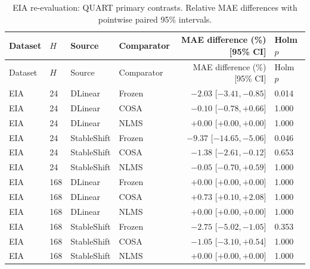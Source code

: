 \begin{longtable}{lllp{}rp{}}
\caption{EIA re-evaluation: QUART primary contrasts. Relative MAE differences with pointwise paired 95\% intervals.}\label{tab:independent_primary}\\
\toprule
Dataset & $H$ & Source & Comparator & MAE difference (\%) [95\% CI] & Holm $p$\\
\midrule
\endfirsthead
\toprule
Dataset & $H$ & Source & Comparator & MAE difference (\%) [95\% CI] & Holm $p$\\
\midrule
\endhead
EIA & 24 & DLinear & Frozen & $-2.03$ [$ -3.41, -0.85 $] & 0.014\\
EIA & 24 & DLinear & COSA & $-0.10$ [$ -0.78, +0.66 $] & 1.000\\
EIA & 24 & DLinear & NLMS & $+0.00$ [$ +0.00, +0.00 $] & 1.000\\
EIA & 24 & StableShift & Frozen & $-9.37$ [$ -14.65, -5.06 $] & 0.046\\
EIA & 24 & StableShift & COSA & $-1.38$ [$ -2.61, -0.12 $] & 0.653\\
EIA & 24 & StableShift & NLMS & $-0.05$ [$ -0.70, +0.59 $] & 1.000\\
EIA & 168 & DLinear & Frozen & $+0.00$ [$ +0.00, +0.00 $] & 1.000\\
EIA & 168 & DLinear & COSA & $+0.73$ [$ +0.10, +2.08 $] & 1.000\\
EIA & 168 & DLinear & NLMS & $+0.00$ [$ +0.00, +0.00 $] & 1.000\\
EIA & 168 & StableShift & Frozen & $-2.75$ [$ -5.02, -1.05 $] & 0.353\\
EIA & 168 & StableShift & COSA & $-1.05$ [$ -3.10, +0.54 $] & 1.000\\
EIA & 168 & StableShift & NLMS & $+0.00$ [$ +0.00, +0.00 $] & 1.000\\
\bottomrule
\end{longtable}
